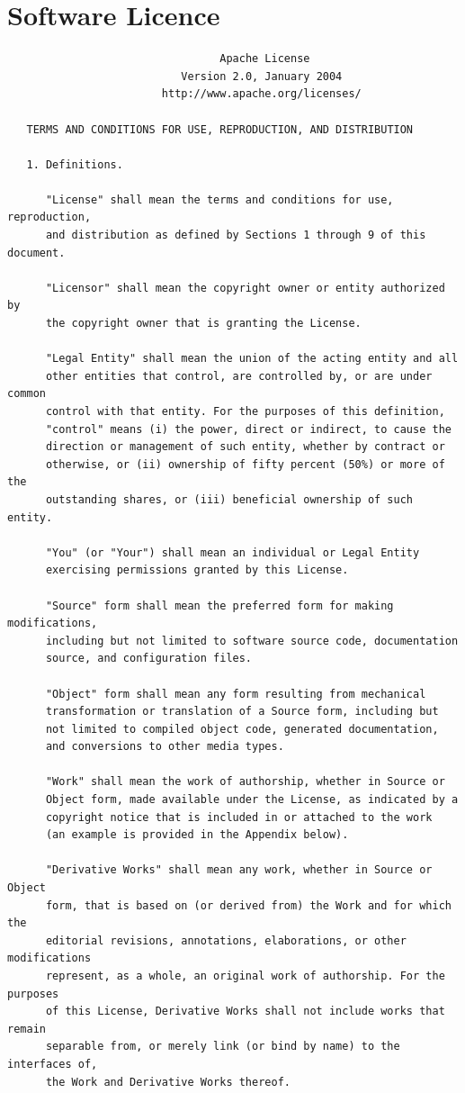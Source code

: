 \documentclass[]{report}
\begin{document}
\section{Software Licence}

\small
\begin{verbatim}
                                 Apache License
                           Version 2.0, January 2004
                        http://www.apache.org/licenses/

   TERMS AND CONDITIONS FOR USE, REPRODUCTION, AND DISTRIBUTION

   1. Definitions.

      "License" shall mean the terms and conditions for use, reproduction,
      and distribution as defined by Sections 1 through 9 of this document.

      "Licensor" shall mean the copyright owner or entity authorized by
      the copyright owner that is granting the License.

      "Legal Entity" shall mean the union of the acting entity and all
      other entities that control, are controlled by, or are under common
      control with that entity. For the purposes of this definition,
      "control" means (i) the power, direct or indirect, to cause the
      direction or management of such entity, whether by contract or
      otherwise, or (ii) ownership of fifty percent (50%) or more of the
      outstanding shares, or (iii) beneficial ownership of such entity.

      "You" (or "Your") shall mean an individual or Legal Entity
      exercising permissions granted by this License.

      "Source" form shall mean the preferred form for making modifications,
      including but not limited to software source code, documentation
      source, and configuration files.

      "Object" form shall mean any form resulting from mechanical
      transformation or translation of a Source form, including but
      not limited to compiled object code, generated documentation,
      and conversions to other media types.

      "Work" shall mean the work of authorship, whether in Source or
      Object form, made available under the License, as indicated by a
      copyright notice that is included in or attached to the work
      (an example is provided in the Appendix below).

      "Derivative Works" shall mean any work, whether in Source or Object
      form, that is based on (or derived from) the Work and for which the
      editorial revisions, annotations, elaborations, or other modifications
      represent, as a whole, an original work of authorship. For the purposes
      of this License, Derivative Works shall not include works that remain
      separable from, or merely link (or bind by name) to the interfaces of,
      the Work and Derivative Works thereof.


\end{verbatim}
\end{document}
